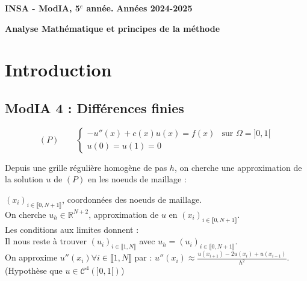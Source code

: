 \documentclass[12pt,a4paper]{article}
\newcommand{\entete}{
    \noindent\textbf{INSA - ModIA, 5$^e$ année.}
    \hfill \textbf{Années 2024-2025}
    
    \begin{center}
        \textbf{\LARGE Analyse Mathématique et principes de la méthode}
    \end{center}
}
\begin{document}
\entete

\vspace{0.5cm}

\section{Introduction}

\subsection{ModIA 4 : Différences finies }

\begin{equation}
    (P) \qquad
    \begin{cases}
        -u''(x) + c(x)u(x) = f(x) & \text{sur } \Omega = ]0,1[ \\
        u(0) = u(1) = 0
    \end{cases}
    \label{eq:P}
\end{equation}

Depuis une grille régulière homogène de pas $h$, on cherche une approximation de la solution $u$ de $(P)$ en les noeuds de maillage : \\



$(x_i)_{i \in \llbracket 0, N + 1 \rrbracket}$, coordonnées des noeuds de maillage. \\

On cherche $u_h \in \mathbb{R}^{N+2}$, approximation de $u$ en $(x_i)_{i \in \llbracket 0, N + 1 \rrbracket}$. \\
Les conditions aux limites donnent : 
\\

Il nous reste à trouver $(u_i)_{i \in \llbracket 1, N \rrbracket}$ avec $u_h = (u_i)_{i \in \llbracket 0, N + 1 \rrbracket}$. \\


On approxime $u''(x_i) \forall i \in \llbracket 1, N \rrbracket$ par : 
$u''(x_i) \approx \frac{u(x_{i+1}) - 2u(x_i) + u(x_{i-1})}{h^2}$. \\
(Hypothèse que $u \in \mathcal{C}^4(]0, 1[)$) \\
\end{document}
